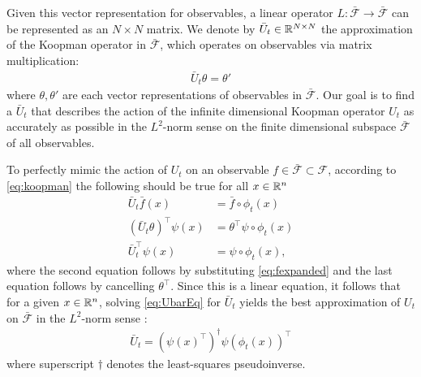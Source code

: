 Given this vector representation for observables, a linear operator $L : \bar{\mathcal{F}} \to \bar{\mathcal{F}}$ can be represented as an ${N \times N}$ matrix. 
We denote by $\bar{U}_t \in \mathbb{R}^{N \times N}$ the approximation of the Koopman operator in $\bar{\mathcal{F}}$, which operates on observables via matrix multiplication:
\begin{align}
    \bar{U}_t \theta = \theta'
\end{align}
where $\theta , \theta'$ are each vector representations of observables in $\bar{\mathcal{F}}$.
Our goal is to find a $\bar{U}_t$ that describes the action of the infinite dimensional Koopman operator $U_t$ as accurately as possible in the $L^2$-norm sense on the finite dimensional subspace $\bar{\mathcal{F}}$ of all observables.

To perfectly mimic the action of $U_t$ on an observable ${f \in \bar{\mathcal{F}} \subset \mathcal{F}}$, according to \eqref{eq:koopman} the following should be true for all $x \in \mathbb{R}^n$
\begin{align}
    \bar{U}_t \bar{f}(x) &= \bar{f} \circ \phi_t (x) \\
    ( \bar{U}_t {\theta} )^\top {\psi}(x) &=
    {\theta}^\top {\psi} \circ \phi_t(x) \\
    \bar{U}_t^\top \psi(x) &= {\psi} \circ \phi_t(x),
    \label{eq:UbarEq}
\end{align}
where the second equation follows by substituting \eqref{eq:fexpanded} and the last equation follows by cancelling $\theta^\top$.
Since this is a linear equation, it follows that for a given ${x \in \mathbb{R}^n}$, solving \eqref{eq:UbarEq} for $\bar{U}_t$ yields the best approximation of $U_t$ on $\bar{\mathcal{F}}$ in the $L^2$-norm sense \cite{penrose1956best}:
\begin{align}
    \bar{U}_t = \left( {\psi}(x)^\top \right)^\dagger {\psi}( \phi_t(x) )^\top
    \label{eq:Uapprox}
\end{align}
where superscript $\dagger$ denotes the least-squares pseudoinverse.

